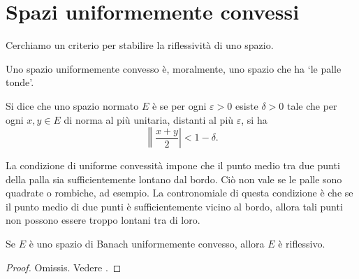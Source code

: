 \section{Spazi uniformemente convessi}
Cerchiamo un criterio per stabilire la riflessività di uno spazio.

Uno spazio uniformemente convesso è, moralmente, uno spazio che ha `le palle tonde'.

\begin{definition}
	Si dice che uno spazio normato $E$ è  se per ogni $\varepsilon > 0$ esiste $\delta > 0$ tale che per ogni $x,y \in E$ di norma al più unitaria, distanti al più $\varepsilon$, si ha
	\begin{equation*}
		\left\|\frac{x+y}2\right| < 1-\delta.
	\end{equation*}
\end{definition}

La condizione di uniforme convessità impone che il punto medio tra due punti della palla sia sufficientemente lontano dal bordo. Ciò non vale se le palle sono quadrate o rombiche, ad esempio.
La contronomiale di questa condizione è che se il punto medio di due punti è sufficientemente vicino al bordo, allora tali punti non possono essere troppo lontani tra di loro.

\begin{theorem}[Milman]
\label{th:milman}
	Se $E$ è uno spazio di Banach uniformemente convesso, allora $E$ è riflessivo.
\end{theorem}
\begin{proof}
	Omissis. Vedere \cite{brezis2010functional}.
\end{proof}

